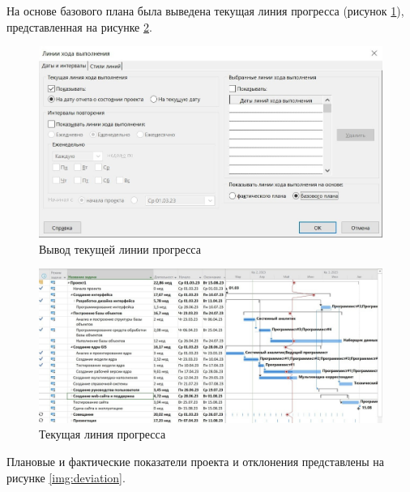 На основе базового плана была выведена текущая линия прогресса (рисунок \ref{img:analysis}), представленная на рисунке \ref{img:progress-line}.

\begin{figure}[H]
	\begin{center}
		\includegraphics[scale=0.25]{inc/img/analysis.jpg}
	\end{center}
	\captionsetup{justification=centering}
	\caption{Вывод текущей линии прогресса}
	\label{img:analysis}
\end{figure}

\begin{figure}[H]
	\begin{center}
		\includegraphics[scale=0.3]{inc/img/progress-line.jpg}
	\end{center}
	\captionsetup{justification=centering}
	\caption{Текущая линия прогресса}
	\label{img:progress-line}
\end{figure}

Плановые и фактические показатели проекта и отклонения представлены на рисунке \ref{img:deviation}.

